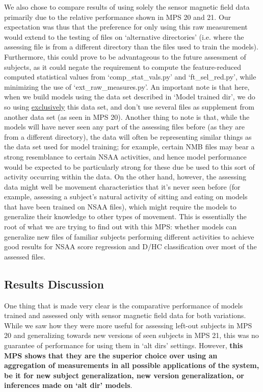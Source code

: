 \documentclass[12pt,twoside]{report}
\begin{document}
\quad We also chose to compare results of using solely the sensor magnetic field data primarily due to the relative performance shown in MPS 20 and 21. Our expectation was thus that the preference for only using this raw measurement would extend to the testing of files on ‘alternative directories’ (i.e. where the assessing file is from a different directory than the files used to train the models). Furthermore, this could prove to be advantageous to the future assessment of subjects, as it could negate the requirement to compute the feature-reduced computed statistical values from ‘comp\_stat\_vals.py’ and ‘ft\_sel\_red.py’, while minimizing the use of ‘ext\_raw\_measures.py’. An important note is that here, when we build models using the data set described in ‘Model trained dir’, we do so using \underline{exclusively} this data set, and don’t use several files as supplement from another data set (as seen in MPS 20). Another thing to note is that, while the models will have never seen any part of the assessing files before (as they are from a different directory), the data will often be representing similar things as the data set used for model training; for example, certain NMB files may bear a strong resemblance to certain NSAA activities, and hence model performance would be expected to be particularly strong for these due be used to this sort of activity occurring within the data. On the other hand, however, the assessing data might well be movement characteristics that it’s never seen before (for example, assessing a subject’s natural activity of sitting and eating on models that have been trained on NSAA files), which might require the models to generalize their knowledge to other types of movement. This is essentially the root of what we are trying to find out with this MPS: whether models can generalize new files of familiar subjects performing different activities to achieve good results for NSAA score regression and D/HC classification over most of the assessed files.


\subsection{Results Discussion}

\quad One thing that is made very clear is the comparative performance of models trained and assessed only with sensor magnetic field data for both variations. While we saw how they were more useful for assessing left-out subjects in MPS 20 and generalizing towards new versions of seen subjects in MPS 21, this was no guarantee of performance for using them in ‘alt dirs’ settings. However, \textbf{this MPS shows that they are the superior choice over using an aggregation of measurements in all possible applications of the system, be it for new subject generalization, new version generalization, or inferences made on ‘alt dir’ models}.\\
\end{document}
